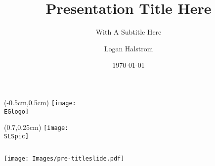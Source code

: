 
\title[Short Title]{Presentation Title Here}
\subtitle{With A Subtitle Here}
\author{Logan Halstrom}
\date{\today}

\ifnum{}%
    \newcommand\EGlogo{Images/NASA_Meatball.png}
    \newcommand\SLSpic{Images/Orion_SLS_trim.png}
\else%
    \newcommand\EGlogo{\remote/NASA_Meatball.png}
    \newcommand\SLSpic{\remote/Images/SLS_Orange.png}
\fi%
{
\begin{textblock*}{0cm}(-0.5cm,0.5cm) %
\texttt{[image: \\EGlogo]}
\end{textblock*}

\begin{textblock*}{0cm}(0.7\textwidth,0.25cm)
\texttt{[image: \\SLSpic]}
\end{textblock*}
}





\ifnum{}
  \vspace{-0.1in}
  \begin{frame}
  \begin{columns}
  \texttt{[image: Images/pre-titleslide.pdf]}
  \end{columns}
  \end{frame}
\fi

